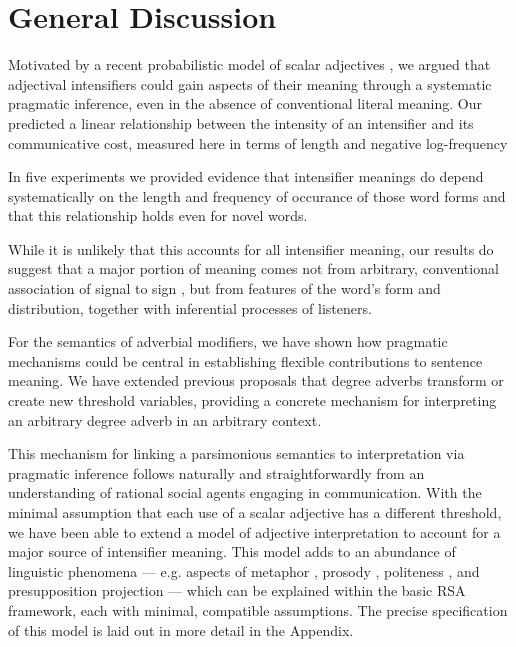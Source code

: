 \section{General Discussion}

Motivated by a recent probabilistic model of scalar adjectives \cite{lassiter_context_2013}, we argued that adjectival intensifiers could gain aspects of their meaning through a systematic pragmatic inference, even in the absence of conventional literal meaning.
Our  predicted a linear relationship between the intensity of an intensifier and its communicative cost, measured here in terms of length and negative log-frequency%

In five experiments we provided evidence that intensifier meanings do depend systematically on the length and frequency of occurance of those word forms and that this relationship holds even for novel words.

While it is unlikely that this accounts for all intensifier meaning, our results do suggest that a major portion of meaning comes not from arbitrary, conventional association of signal to sign \cite{de_saussure_nature_1916}, but from features of the word's form and distribution, together with inferential processes of listeners.

For the semantics of adverbial modifiers, we have shown how pragmatic mechanisms could be central in establishing flexible contributions to sentence meaning.
We have extended previous proposals that degree adverbs transform or create new threshold variables, providing a concrete mechanism for interpreting an arbitrary degree adverb in an arbitrary context.

This mechanism for linking a parsimonious semantics to interpretation via pragmatic inference follows naturally and straightforwardly from an understanding of rational social agents engaging in communication.
With the minimal assumption that each use of a scalar adjective has a different threshold, we have been able to extend a model of adjective interpretation to account for a major source of intensifier meaning.
This model adds to an abundance of linguistic phenomena --- e.g. aspects of metaphor \cite{kao_formalizing_2014}, prosody \cite{bergen_strategic_2015}, politeness \cite{yoon_i_2017}, and presupposition projection \cite{qing_rational_2016} --- which can be explained within the basic RSA framework, each with minimal, compatible assumptions.
The precise specification of this model is laid out in more detail in the Appendix.

